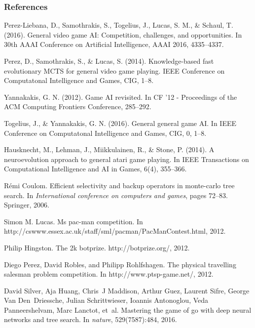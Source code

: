 \documentclass{beamer}
\begin{document}
\begin{frame}[allowframebreaks]
\frametitle{References}
\footnotesize{
\begin{thebibliography}{99} %
    Perez-Liebana, D., Samothrakis, S., Togelius, J., Lucas, S. M., \& Schaul, T. (2016). 
    \newblock General video game AI: Competition, challenges, and opportunities. 
    \newblock In 30th AAAI Conference on Artificial Intelligence, AAAI 2016, 4335–4337.

    Perez, D., Samothrakis, S., \& Lucas, S. (2014). 
    \newblock Knowledge-based fast evolutionary MCTS for general video game playing.
    \newblock IEEE Conference on Computatonal Intelligence and Games, CIG, 1–8.


    Yannakakis, G. N. (2012). 
    \newblock Game AI revisited.
    \newblock In CF ’12 - Proceedings of the ACM Computing Frontiers Conference, 285–292.

    Togelius, J., \& Yannakakis, G. N. (2016). 
    \newblock General general game AI. 
    \newblock In IEEE Conference on Computatonal Intelligence and Games, CIG, 0, 1–8.

    Hausknecht, M., Lehman, J., Miikkulainen, R., \& Stone, P. (2014). 
    \newblock A neuroevolution approach to general atari game playing. 
    \newblock In IEEE Transactions on Computational Intelligence and AI in Games, 6(4), 355–366.

    R{\'e}mi Coulom.
    \newblock Efficient selectivity and backup operators in monte-carlo tree search.
    \newblock In {\em International conference on computers and games}, pages 72--83. Springer, 2006.



    Simon M. Lucas. 
    \newblock Ms pac-man competition. 
    \newblock In http://cswww.essex.ac.uk/staff/sml/pacman/PacManContest.html, 2012.

    Philip Hingston.
    \newblock The 2k botprize.
    \newblock http://botprize.org/, 2012.



    Diego Perez, David Robles, and Philipp Rohlfshagen. 
    \newblock The physical travelling salesman problem competition. 
    \newblock In http://www.ptsp-game.net/, 2012. 
    
    David Silver, Aja Huang, Chris~J Maddison, Arthur Guez, Laurent Sifre, George Van Den~Driessche, Julian Schrittwieser, Ioannis Antonoglou, Veda Panneershelvam, Marc Lanctot, et~al.
    \newblock Mastering the game of go with deep neural networks and tree search.
    \newblock In {\em nature}, 529(7587):484, 2016.


\end{thebibliography}}
\end{frame}
\end{document}
